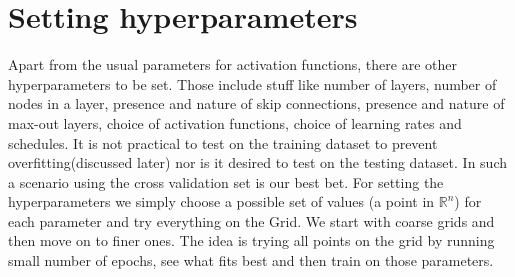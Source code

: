 \section{Setting hyperparameters}
Apart from the usual parameters for activation functions, there are other
hyperparameters to be set. Those include stuff like number of layers, number of nodes in a layer,
presence and nature of skip connections, presence and nature of max-out
layers, choice of activation functions, choice of learning rates and schedules. It is not practical to test on the training dataset to prevent
overfitting(discussed later) nor is it desired to test on the testing dataset. In such a scenario using the cross validation set is our best bet. For setting the hyperparameters we simply choose a possible set of values (a point in $\mathbb R^n$)
for each parameter and try everything on the Grid. We start with coarse grids and then move on to finer ones. The idea is trying all points on the grid by running small number of epochs, see what fits best and then train on those parameters. 
